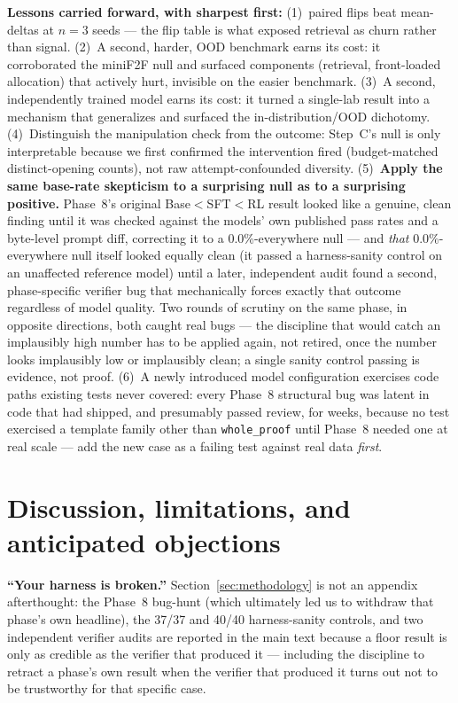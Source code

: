 \documentclass{article}
\begin{document}
\textbf{Lessons carried forward, with sharpest first:} (1)~paired flips beat mean-deltas at $n{=}3$
seeds --- the flip table is what exposed retrieval as churn rather than signal. (2)~A second, harder,
OOD benchmark earns its cost: it corroborated the miniF2F null and surfaced components (retrieval,
front-loaded allocation) that actively hurt, invisible on the easier benchmark. (3)~A second,
independently trained model earns its cost: it turned a single-lab result into a mechanism that
generalizes and surfaced the in-distribution/OOD dichotomy. (4)~Distinguish the manipulation check from
the outcome: Step~C's null is only interpretable because we first confirmed the intervention fired
(budget-matched distinct-opening counts), not raw attempt-confounded diversity. (5)~\textbf{Apply the
same base-rate skepticism to a surprising null as to a surprising positive.} Phase~8's original
Base$<$SFT$<$RL result looked like a genuine, clean finding until it was checked against the models' own
published pass rates and a byte-level prompt diff, correcting it to a 0.0\%-everywhere null --- and
\emph{that} 0.0\%-everywhere null itself looked equally clean (it passed a harness-sanity control on an
unaffected reference model) until a later, independent audit found a second, phase-specific verifier bug
that mechanically forces exactly that outcome regardless of model quality. Two rounds of scrutiny on the
same phase, in opposite directions, both caught real bugs --- the discipline that would catch an
implausibly high number has to be applied again, not retired, once the number looks implausibly low or
implausibly clean; a single sanity control passing is evidence, not proof. (6)~A newly introduced model
configuration exercises code paths existing tests never covered: every Phase~8 structural bug was latent
in code that had shipped, and presumably passed review, for weeks, because no test exercised a template
family other than \texttt{whole\_proof} until Phase~8 needed one at real scale --- add the new case as a
failing test against real data \emph{first}.

\section{Discussion, limitations, and anticipated objections}
\label{sec:discussion}

\textbf{``Your harness is broken.''} Section~\ref{sec:methodology} is not an appendix afterthought: the
Phase~8 bug-hunt (which ultimately led us to withdraw that phase's own headline), the 37/37 and 40/40
harness-sanity controls, and two independent verifier audits are reported in the main text because a
floor result is only as credible as the verifier that produced it --- including the discipline to
retract a phase's own result when the verifier that produced it turns out not to be trustworthy for that
specific case.
\end{document}
